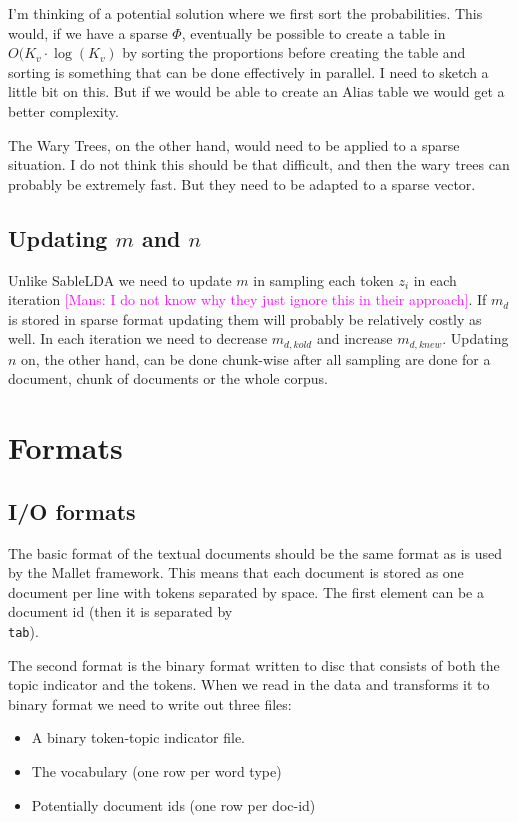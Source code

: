 \documentclass{article}
\newcommand{\mm}[1]{{\textcolor{magenta}{[Mans: #1]}}}
\begin{document}
I'm thinking of a potential solution where we first sort the probabilities. This would, if we have a sparse $\Phi$, eventually be possible to create a table in $O(K_v \cdot \log(K_v)$ by sorting the proportions before creating the table and sorting is something that can be done effectively in parallel. I need to sketch a little bit on this. But if we would be able to create an Alias table we would get a better complexity. 

The Wary Trees, on the other hand, would need to be applied to a sparse situation. I do not think this should be that difficult, and then the wary trees can probably be extremely fast. But they need to be adapted to a sparse vector.

\subsection{Updating $m$ and $n$}

Unlike SableLDA we need to update $m$ in sampling each token $z_i$ in each iteration \mm{I do not know why they just ignore this in their approach}. If $m_d$ is stored in sparse format updating them will probably be relatively costly as well. In each iteration we need to decrease $m_{d,kold}$ and increase $m_{d,knew}$. Updating $n$ on, the other hand, can be done chunk-wise after all sampling are done for a document, chunk of documents or the whole corpus.

\section{Formats}

\subsection{I/O formats}

The basic format of the textual documents should be the same format as is used by the Mallet framework. This means that each document is stored as one document per line with tokens separated by space. The first element can be a document id (then it is separated by \texttt{\\tab}).

The second format is the binary format written to disc that consists of both the topic indicator and the tokens. When we read in the data and transforms it to binary format we need to write out three files:

\begin{itemize}
  \item A binary token-topic indicator file.
  \item The vocabulary (one row per word type)
  \item Potentially document ids (one row per doc-id)
\end{itemize}
\end{document}
